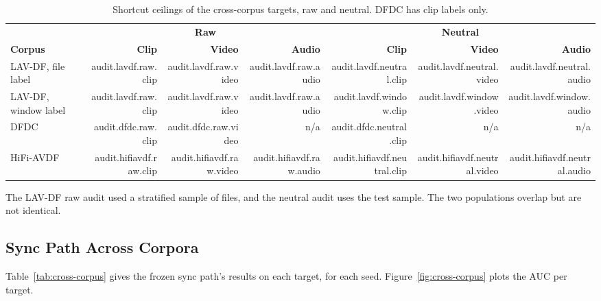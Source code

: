 \begin{table}[ht]
    \centering
    \small
    \caption{Shortcut ceilings of the cross-corpus targets, raw and neutral. DFDC has clip labels only.}
    \label{tab:target-ceilings}
    \begin{tabular}{l r r r r r r}
        \toprule
         & \multicolumn{3}{c}{\textbf{Raw}} & \multicolumn{3}{c}{\textbf{Neutral}} \\
        \textbf{Corpus} & \textbf{Clip} & \textbf{Video} & \textbf{Audio} & \textbf{Clip} & \textbf{Video} & \textbf{Audio} \\
        \midrule
        LAV-DF, file label & {{audit.lavdf.raw.clip}} & {{audit.lavdf.raw.video}} & {{audit.lavdf.raw.audio}} & {{audit.lavdf.neutral.clip}} & {{audit.lavdf.neutral.video}} & {{audit.lavdf.neutral.audio}} \\
        LAV-DF, window label & {{audit.lavdf.raw.clip}} & {{audit.lavdf.raw.video}} & {{audit.lavdf.raw.audio}} & {{audit.lavdf.window.clip}} & {{audit.lavdf.window.video}} & {{audit.lavdf.window.audio}} \\
        DFDC      & {{audit.dfdc.raw.clip}} & {{audit.dfdc.raw.video}} & n/a & {{audit.dfdc.neutral.clip}} & n/a & n/a \\
        HiFi-AVDF & {{audit.hifiavdf.raw.clip}} & {{audit.hifiavdf.raw.video}} & {{audit.hifiavdf.raw.audio}} & {{audit.hifiavdf.neutral.clip}} & {{audit.hifiavdf.neutral.video}} & {{audit.hifiavdf.neutral.audio}} \\
        \bottomrule
    \end{tabular}
\end{table}

The LAV-DF raw audit used a stratified sample of files, and the neutral audit
uses the test sample. The two populations overlap but are not identical.

\subsection{Sync Path Across Corpora}

Table~\ref{tab:cross-corpus} gives the frozen sync path's results on each
target, for each seed. Figure~\ref{fig:cross-corpus} plots the AUC per target.

